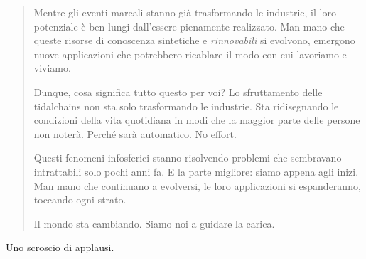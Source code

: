 \begin{quote}
Mentre gli eventi mareali stanno già trasformando le industrie, il loro potenziale è ben lungi dall'essere pienamente realizzato. Man mano che queste risorse di conoscenza sintetiche e \textit{rinnovabili} si evolvono, emergono nuove applicazioni che potrebbero ricablare il modo con cui lavoriamo e viviamo.

Dunque, cosa significa tutto questo per voi? Lo sfruttamento delle tidalchains non sta solo trasformando le industrie. Sta ridisegnando le condizioni della vita quotidiana in modi che la maggior parte delle persone non noterà. Perché sarà automatico. No effort.

Questi fenomeni infosferici stanno risolvendo problemi che sembravano intrattabili solo pochi anni fa. E la parte migliore: siamo appena agli inizi. Man mano che continuano a evolversi, le loro applicazioni si espanderanno, toccando ogni strato.

Il mondo sta cambiando. Siamo noi a guidare la carica.

\end{quote}

Uno scroscio di applausi.
